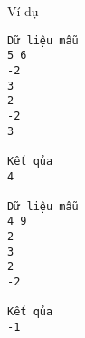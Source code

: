 Ví dụ
\begin{verbatim}
Dữ liệu mẫu
5 6
-2
3
2
-2
3

Kết qủa
4

Dữ liệu mẫu
4 9
2
3
2
-2

Kết qủa
-1
\end{verbatim}